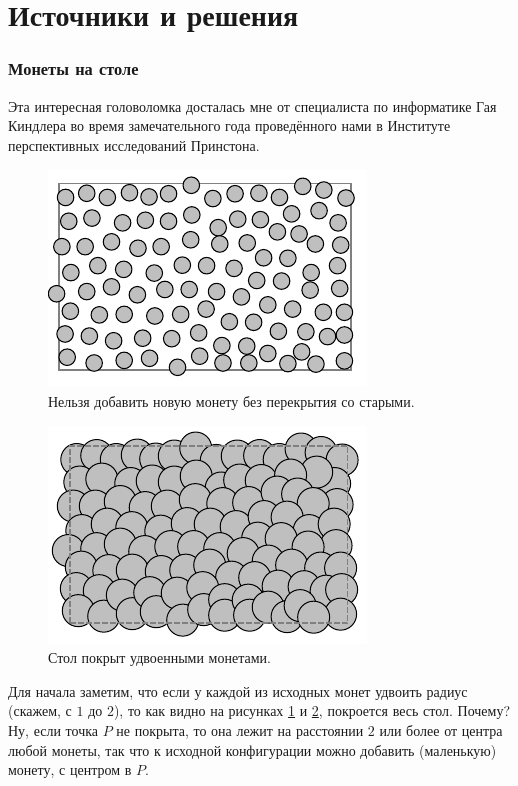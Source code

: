 \section*{Источники и решения}

\subsubsection*{Монеты на столе}

Эта интересная головоломка досталась мне от специалиста по информатике Гая Киндлера во время замечательного года проведённого нами в Институте перспективных исследований Принстона.

\begin{figure}[t!]
\centering
\includegraphics[scale=1]{pics/coin1}
\caption{Нельзя добавить новую монету без перекрытия со старыми.}
\label{pic:coin1}
\end{figure}

\begin{figure}[b!]
\centering
\includegraphics[scale=1]{pics/coin2}
\caption{Стол покрыт удвоенными монетами.}
\label{pic:coin2}
\end{figure}

Для начала заметим, что если у каждой из исходных монет удвоить радиус (скажем, с $1$ до $2$), то как видно на рисунках \ref{pic:coin1} и \ref{pic:coin2}, покроется весь стол.
Почему?
Ну, если точка $P$ не покрыта, то она лежит на расстоянии $2$ или более от центра любой монеты, так что  к исходной конфигурации можно добавить (маленькую) монету, с центром в $P$.

